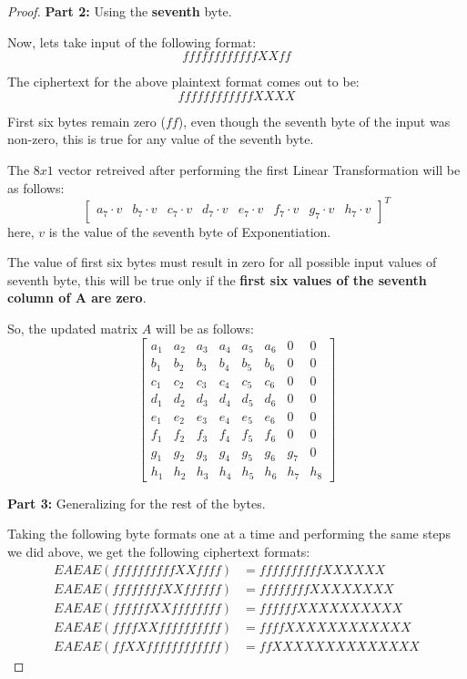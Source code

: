 \documentclass[10pt,twoside]{article}
\begin{document}
\begin{proof}
  \textbf{Part 2:} Using the \textbf{seventh} byte. \newline

  Now, lets take input of the following format:
  $$ffffffffffffXXff$$

  The ciphertext for the above plaintext format comes out to be:
  $$ffffffffffffXXXX$$

  First six bytes remain zero ($ff$), even though the seventh byte of the input was non-zero, this is true for any value of the seventh byte. \newline

  The $8x1$ vector retreived after performing the first Linear Transformation will be as follows:
  $$\begin{bmatrix}
    a_7\cdot v & b_7\cdot v & c_7\cdot v & d_7\cdot v & e_7\cdot v & f_7\cdot v & g_7\cdot v & h_7\cdot v
  \end{bmatrix}^T$$
  here, $v$ is the value of the seventh byte of Exponentiation. \newline

  The value of first six bytes must result in zero for all possible input values of seventh byte, this will be true only if the \textbf{first six values of the seventh column of A are zero}. \newline

  So, the updated matrix $A$ will be as follows:
  $$\begin{bmatrix}
    a_1 & a_2 & a_3 & a_4 & a_5 & a_6 & 0 & 0\\
    b_1 & b_2 & b_3 & b_4 & b_5 & b_6 & 0 & 0\\
    c_1 & c_2 & c_3 & c_4 & c_5 & c_6 & 0 & 0\\
    d_1 & d_2 & d_3 & d_4 & d_5 & d_6 & 0 & 0\\
    e_1 & e_2 & e_3 & e_4 & e_5 & e_6 & 0 & 0\\
    f_1 & f_2 & f_3 & f_4 & f_5 & f_6 & 0 & 0\\
    g_1 & g_2 & g_3 & g_4 & g_5 & g_6 & g_7 & 0\\
    h_1 & h_2 & h_3 & h_4 & h_5 & h_6 & h_7 & h_8
  \end{bmatrix}$$

  \textbf{Part 3:} Generalizing for the rest of the bytes. \newline
  
  Taking the following byte formats one at a time and performing the same steps we did above, we get the following ciphertext formats:
  \begin{align*}
    EAEAE(ffffffffffXXffff) &= ffffffffffXXXXXX \\
    EAEAE(ffffffffXXffffff) &= ffffffffXXXXXXXX \\
    EAEAE(ffffffXXffffffff) &= ffffffXXXXXXXXXX \\
    EAEAE(ffffXXffffffffff) &= ffffXXXXXXXXXXXX \\
    EAEAE(ffXXffffffffffff) &= ffXXXXXXXXXXXXXX
  \end{align*} \newline


\end{proof}
\end{document}
